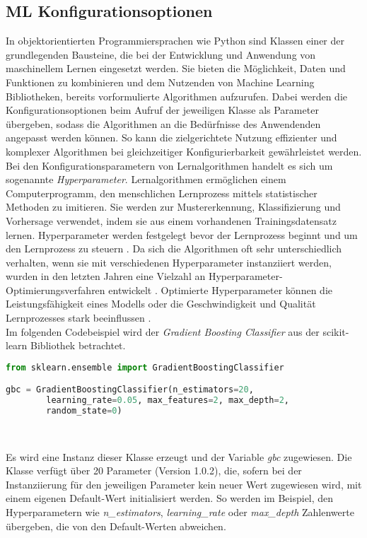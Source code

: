 \documentclass[german,bachelor]{swsLeipzig}
\begin{document}
\subsection{ML Konfigurationsoptionen} \label{ML Konfigurationsoptionen}
In objektorientierten Programmiersprachen wie Python sind Klassen einer der grundlegenden Bausteine, die bei der Entwicklung und Anwendung
von maschinellem Lernen eingesetzt werden.
Sie bieten die Möglichkeit, Daten und Funktionen zu kombinieren und dem Nutzenden von Machine Learning Bibliotheken,
bereits vorformulierte Algorithmen aufzurufen.
Dabei werden die Konfigurationsoptionen beim Aufruf der jeweiligen Klasse als Parameter übergeben, sodass die Algorithmen
an die Bedürfnisse des Anwendenden angepasst werden können.
So kann die zielgerichtete Nutzung effizienter und komplexer Algorithmen bei gleichzeitiger Konfigurierbarkeit gewährleistet werden. \\

Bei den Konfigurationsparametern von Lernalgorithmen handelt es sich um sogenannte \textit{Hyperparameter}.
Lernalgorithmen ermöglichen einem Computerprogramm, den menschlichen Lernprozess mittels statistischer Methoden zu imitieren.
Sie werden zur Mustererkennung, Klassifizierung und Vorhersage verwendet, indem sie aus einem vorhandenen Trainingsdatensatz
lernen.
Hyperparameter werden festgelegt bevor der Lernprozess beginnt und um den Lernprozess zu steuern \cite[]{hype}.
Da sich die Algorithmen oft sehr unterschiedlich verhalten, wenn sie mit verschiedenen Hyperparameter instanziiert werden,
wurden in den letzten Jahren eine Vielzahl an Hyperparameter-Optimierungsverfahren entwickelt \cite[]{pmlr-v32-hutter14}.
Optimierte Hyperparameter können die Leistungsfähigkeit eines Modells oder die Geschwindigkeit und Qualität Lernprozesses stark beeinflussen \cite[]{hype}.\\

Im folgenden Codebeispiel wird der \textit{Gradient Boosting Classifier} aus der scikit-learn Bibliothek betrachtet.\\

\begin{lstlisting}[language=Python, frame=single, basicstyle=\small]
from sklearn.ensemble import GradientBoostingClassifier

gbc = GradientBoostingClassifier(n_estimators=20,
        learning_rate=0.05, max_features=2, max_depth=2,
        random_state=0)
\end{lstlisting}
\

Es wird eine Instanz dieser Klasse erzeugt und der Variable \textit{gbc} zugewiesen.
Die Klasse verfügt über 20 Parameter (Version 1.0.2), die, sofern bei der Instanziierung für den jeweiligen Parameter
kein neuer Wert zugewiesen wird, mit einem eigenen Default-Wert initialisiert werden.
So werden im Beispiel, den Hyperparametern wie \textit{n\_estimators}, \textit{learning\_rate} oder \textit{max\_depth}
Zahlenwerte übergeben, die von den Default-Werten abweichen.\\
\end{document}

